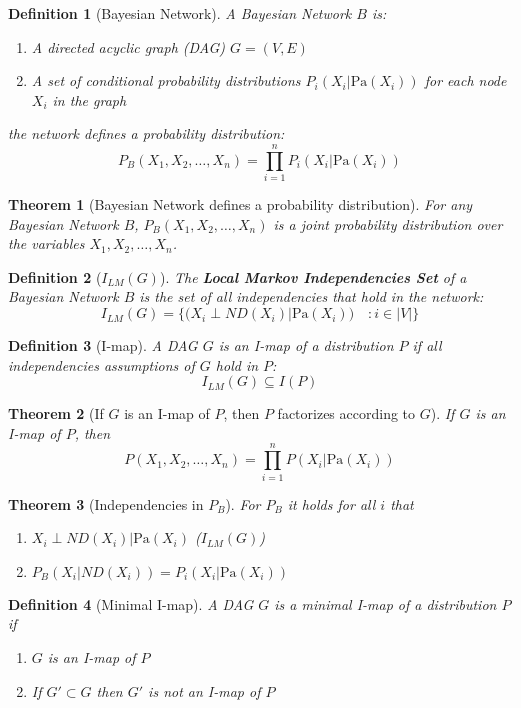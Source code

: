 \documentclass[11pt]{article}
\numberwithin{equation}{section}
\theoremstyle{boldStyle}
\theoremstyle{boldBlueStyle}
\theoremstyle{boldPurpleStyle}
\newtheorem{theorem}{Theorem}[section]
\theoremstyle{boldRedStyle}
\newtheorem{definition}{Definition}[section]
\begin{document}
\begin{definition}[Bayesian Network]
    A Bayesian Network $B$ is:
    \begin{enumerate}
        \item A directed acyclic graph (DAG) $G = (V, E)$
        \item A set of conditional probability distributions $P_i(X_i | \text{Pa}(X_i))$ for each node $X_i$ in the graph
    \end{enumerate}
    the network defines a probability distribution: 
    \begin{equation*}
        P_B(X_1, X_2, \ldots, X_n) = \prod_{i=1}^{n} P_i(X_i | \text{Pa}(X_i))
    \end{equation*}
\end{definition}

\begin{theorem}[Bayesian Network defines a probability distribution]
    For any Bayesian Network $B$, $P_B(X_1, X_2, \ldots, X_n)$ is a joint probability distribution over the variables $X_1, X_2, \ldots, X_n$.
\end{theorem}

\begin{definition}[$I_{LM}(G)$]
    The \textbf{Local Markov Independencies Set} of a Bayesian Network $B$ is the set of all independencies that hold in the network:
    \begin{equation*}
        I_{LM}(G) = \{ (X_i \perp ND(X_i) | \text{Pa}(X_i)) \quad : i \in |V| \}
    \end{equation*}
\end{definition}

\begin{definition}[I-map]
    A DAG $G$ is an I-map of a distribution $P$ if all independencies assumptions of $G$ hold in $P$:
    \begin{equation*}
        I_{LM}(G) \subseteq I(P)
    \end{equation*}
\end{definition}

\begin{theorem}[If $G$ is an I-map of $P$, then $P$ factorizes according to $G$]
    If $G$ is an I-map of $P$, then
    \begin{equation*}
        P(X_1, X_2, \ldots, X_n) = \prod_{i=1}^{n} P(X_i | \text{Pa}(X_i))
    \end{equation*}
\end{theorem}

\begin{theorem}[Independencies in $P_B$]
    For $P_B$ it holds for all $i$ that
    \begin{enumerate}
        \item $X_i \perp ND(X_i) | \text{Pa}(X_i)$  \quad  ($I_{LM}(G)$)
        \item $P_B(X_i | ND(X_i)) = P_i(X_i | \text{Pa}(X_i))$
    \end{enumerate}
\end{theorem}

\begin{definition}[Minimal I-map]
    A DAG $G$ is a minimal I-map of a distribution $P$ if 
    \begin{enumerate}
        \item $G$ is an I-map of $P$
        \item If $G' \subset G$ then $G'$ is not an I-map of $P$
    \end{enumerate}
\end{definition}
\end{document}
